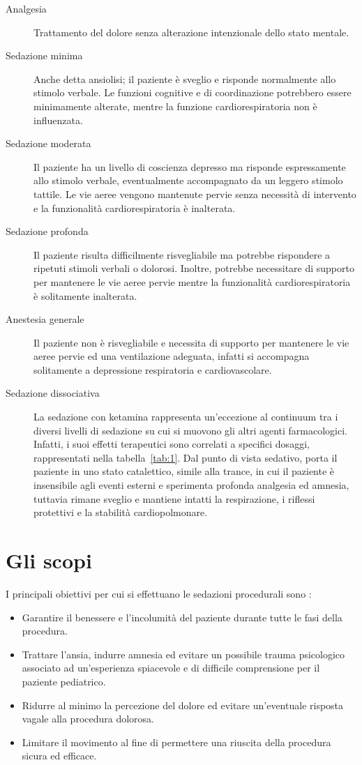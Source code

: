 \begin{description}
\item[Analgesia] Trattamento del dolore senza alterazione intenzionale dello stato mentale.
\item[Sedazione minima] Anche detta ansiolisi; il paziente è sveglio e risponde normalmente allo stimolo verbale. Le funzioni cognitive e di coordinazione potrebbero essere minimamente alterate, mentre la funzione cardiorespiratoria non è influenzata.
\item[Sedazione moderata] Il paziente ha un livello di coscienza depresso ma risponde espressamente allo stimolo verbale, eventualmente accompagnato da un leggero stimolo tattile. Le vie aeree vengono mantenute pervie senza necessità di intervento e la funzionalità cardiorespiratoria è inalterata. 
\item[Sedazione profonda] Il paziente risulta difficilmente risvegliabile ma potrebbe rispondere a ripetuti stimoli verbali o dolorosi. Inoltre, potrebbe necessitare di supporto per mantenere le vie aeree pervie mentre la funzionalità cardiorespiratoria è solitamente inalterata. 
\item[Anestesia generale] Il paziente non è risvegliabile e necessita di supporto per mantenere le vie aeree pervie ed una ventilazione adeguata, infatti si accompagna solitamente a depressione respiratoria e cardiovascolare. 
\item[Sedazione dissociativa] La sedazione con ketamina rappresenta un'eccezione al continuum tra i diversi livelli di sedazione su cui si muovono gli altri agenti farmacologici. Infatti, i suoi effetti terapeutici sono correlati a specifici dosaggi, rappresentati nella tabella~\ref{tab:1}. Dal punto di vista sedativo, porta il paziente in uno stato catalettico, simile alla trance, in cui il paziente è insensibile agli eventi esterni e sperimenta profonda analgesia ed amnesia, tuttavia rimane sveglio e mantiene intatti la respirazione, i riflessi protettivi e la stabilità cardiopolmonare.

\end{description}

\section{Gli scopi}

I principali obiettivi per cui si effettuano le sedazioni procedurali sono \cite{Uptodatesed}: 

\begin{itemize}
    \item Garantire il benessere e l'incolumità del paziente durante tutte le fasi della procedura.
    \item Trattare l'ansia, indurre amnesia ed evitare un possibile trauma psicologico associato ad un'esperienza spiacevole e di difficile comprensione per il paziente pediatrico.
    \item Ridurre al minimo la percezione del dolore ed evitare un'eventuale risposta vagale alla procedura dolorosa.
    \item Limitare il movimento al fine di permettere una riuscita della procedura sicura ed efficace.

\end{itemize}

